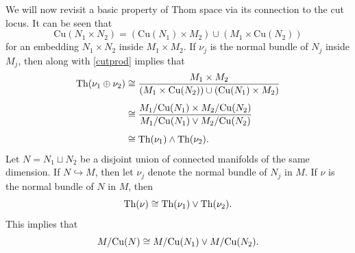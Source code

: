 \vspace{0.3cm}
\hf We will now revisit a basic property of Thom space via its connection to the cut locus. It can be seen that 
\begin{equation}\label{cutprod}
    \mathrm{Cu}(N_1\times N_2)=(\mathrm{Cu}(N_1)\times M_2)\cup (M_1\times \mathrm{Cu}(N_2))
\end{equation}
for an embedding $N_1\times N_2$ inside $M_1\times M_2$. If $\nu_j$ is the normal bundle of $N_j$ inside $M_j$, then  along with \eqref{cutprod} implies that
\begin{align*}
    \textup{Th}(\nu_1\oplus \nu_2) & \cong \frac{M_1\times M_2}{(M_1\times \mathrm{Cu}(N_2))\cup (\mathrm{Cu}(N_1)\times M_2)}
    \\[1ex]
    & \cong \frac{M_1/\mathrm{Cu}(N_1)\times M_2/\mathrm{Cu}(N_2)}{M_1/\mathrm{Cu}(N_1)\vee M_2/\mathrm{Cu}(N_2)}
    \\[1ex]
    & \cong \textup{Th}(\nu_1)\wedge \textup{Th}(\nu_2).
\end{align*}
Let $N=N_1\sqcup N_2$ be a disjoint union of connected manifolds of the same dimension. If $N\hookrightarrow M$, then let $\nu_j$ denote the normal bundle of $N_j$ in $M$. If $\nu$ is the normal bundle of $N$ in $M$, then 
\begin{equation}\label{Thomwedge}
    \textup{Th}(\nu)\cong \textup{Th}(\nu_1)\vee \textup{Th}(\nu_2).
\end{equation}
This implies that
\begin{displaymath}
    M/\mathrm{Cu}(N) \cong M/\mathrm{Cu}(N_1)\vee M/\mathrm{Cu}(N_2).
\end{displaymath}
